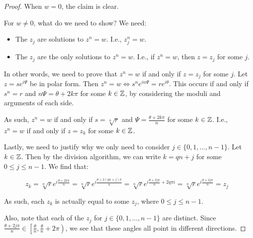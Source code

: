 \begin{proof} When $w = 0$, the claim is clear.

For $w\ne 0$, what do we need to show? We need:

\begin{itemize}
\item The $z_j$ are solutions to $z^n = w$. I.e., $z_j^n = w$.
\item The $z_j$ are the only solutions to $z^n = w$. I.e., if $z^n = w$, then $z = z_j$ for some $j$.
\end{itemize}

In other words, we need to prove that $z^n = w$ if and only if $z = z_j$ for some $j$. Let $z = se^{i\Psi}$ be in polar form. Then $z^n = w \iff  s^ne^{in\Psi} = re^{i\theta}$. This occurs if and only if $s^n = r$ and $n\Psi = \theta + 2k\pi$ for some $k\in \mathbb{Z}$, by considering the moduli and arguments of each side.

As such, $z^n = w$ if and only if $s = \sqrt[n]{r}$ and $\Psi = \frac{\theta + 2k\pi}{n}$ for some $k\in \mathbb{Z}$. I.e., $z^n = w$ if and only if $z = z_k$ for some $k\in \mathbb{Z}$.


Lastly, we need to justify why we only need to consider $j\in \{0,1,\dots,n-1\}$. Let $k\in \mathbb{Z}$. Then by the division algorithm, we can write $k = qn + j$ for some $0 \le j \le n-1$. We find that:

$$z_k = \sqrt[n]{r}e^{i\frac{\theta + 2k\pi}{n}} = \sqrt[n]{r}e^{i\frac{\theta + 2(qn + j)\pi}{n}} = \sqrt[n]{r}e^{i\frac{\theta+2j\pi}{n} + 2q\pi i} = \sqrt[n]{r}e^{i\frac{\theta + 2j\pi}{n}} = z_j$$

As such, each $z_k$ is actually equal to some $z_j$, where $0\le j \le n-1$.


Also, note that each of the $z_j$ for $j\in \{0,1,\dots,n-1\}$ are distinct. Since $\frac{\theta + 2j\pi}{n} \in \left[\frac{\theta}{n},\frac{\theta}{n} + 2\pi\right)$, we see that these angles all point in different directions.








\end{proof}
